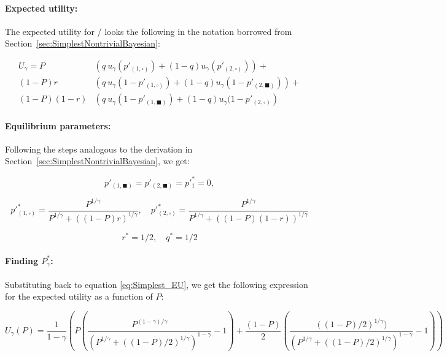 \documentclass{article}
\newcommand{\wb}{\square}
\newcommand{\bb}{\blacksquare}
\theoremstyle{definition}
\begin{document}
\paragraph{Expected utility:}
The expected utility for \PI/ looks the following in the notation borrowed from Section~\ref{sec:SimplestNontrivialBayesian}:

\begin{equation}
\label{eq:Simplest_EU}
    \begin{split}
        U_\gamma = P & \left ( 
        q \ u_\gamma(p'_{(1,\wb)}) + (1-q) u_\gamma(p'_{(2,\wb)})
        \right ) + \\
        (1-P) r & \left (
        q \ u_\gamma(1-p'_{(1,\wb)}) + (1-q) u_\gamma(1-p'_{(2,\bb)})
        \right) + \\
        (1-P) (1-r) & \left (
        q \ u_\gamma(1-p'_{(1,\bb)}) + (1-q) u_\gamma(1-p'_{(2,\wb)}
        \right )
    \end{split}
\end{equation}

\paragraph{Equilibrium parameters:}
Following the steps analogous to the derivation in Section~\ref{sec:SimplestNontrivialBayesian}, we get:

\begin{equation}
    p'_{(1,\bb)} = p'_{(2,\bb)} = p'^*_1 = 0,
\end{equation}


\begin{equation}
\label{eq:SimplestEUsplitting}
    p'^*_{(1,\wb)} = \frac{P^{1/\gamma}}{P^{1/\gamma}+((1-P) r)^{1/\gamma}}, \quad  p'^*_{(2,\wb)} = \frac{P^{1/\gamma}}{P^{1/\gamma}+((1-P)(1-r))^{1/\gamma}}
\end{equation}

\begin{equation}
    r^* = 1/2, \quad q^* = 1/2
\end{equation}

\paragraph{Finding $P^*_\gamma$:}
Substituting back to equation \eqref{eq:Simplest_EU}, we get the following expression for the expected utility as a function of $P$:

\begin{equation}
    U_\gamma(P) =
    \frac{1}{1-\gamma}
    \left (
    P
    \left (
    \frac{P^{(1-\gamma)/\gamma}}{(P^{1/\gamma}+((1-P) /2)^{1/\gamma})^{1-\gamma} }
    - 1
    \right ) +
    \frac{(1-P)}{2}
    \left (
    \frac{((1-P) /2)^{1/\gamma})}{(P^{1/\gamma}+((1-P) /2)^{1/\gamma})^{1-\gamma} }
    - 1
    \right )
    \right )
\end{equation}
\end{document}
